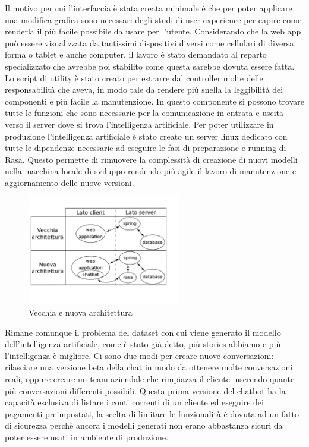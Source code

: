 Il motivo per cui l'interfaccia è stata creata minimale è che per poter applicare una modifica grafica sono necessari degli studi di user experience per capire come renderla il più facile possibile da usare per l'utente. Considerando che la web app può essere visualizzata da tantissimi dispositivi diversi come cellulari di diversa forma o tablet e anche computer, il lavoro è stato demandato al reparto specializzato che avrebbe poi stabilito come questa sarebbe dovuta essere fatta.
Lo script di utility è stato creato per estrarre dal controller molte delle responsabilità che aveva, in modo tale da rendere più snella la leggibilità dei componenti e più facile la manutenzione. In questo componente si possono trovare tutte le funzioni che sono necessarie per la comunicazione in entrata e uscita verso il server dove si trova l'intelligenza artificiale.
Per poter utilizzare in produzione l'intelligenza artificiale è stato creato un server linux dedicato con tutte le dipendenze necessarie ad eseguire le fasi di preparazione e running di Rasa. Questo permette di rimuovere la complessità di creazione di nuovi modelli nella macchina locale di sviluppo rendendo più agile il lavoro di manutenzione e aggiornamento delle nuove versioni.
\begin{figure}[H]
 \centering
  \includegraphics[width=0.6\textwidth]{img/old-new.png}
 \caption{Vecchia e nuova architettura}
\end{figure}
Rimane comunque il problema del dataset con cui viene generato il modello dell'intelligenza artificiale, come è stato già detto, più stories abbiamo e più l'intelligenza è migliore. Ci sono due modi per creare nuove conversazioni: rilasciare una versione beta della chat in modo da ottenere molte conversazioni reali, oppure creare un team aziendale che rimpiazza il cliente inserendo quante più conversazioni differenti possibili.
Questa prima versione del chatbot ha la capacità esclusiva di listare i conti correnti di un cliente ed eseguire dei pagamenti preimpostati, la scelta di limitare le funzionalità è dovuta ad un fatto di sicurezza perchè ancora i modelli generati non erano abbastanza sicuri da poter essere usati in ambiente di produzione.
